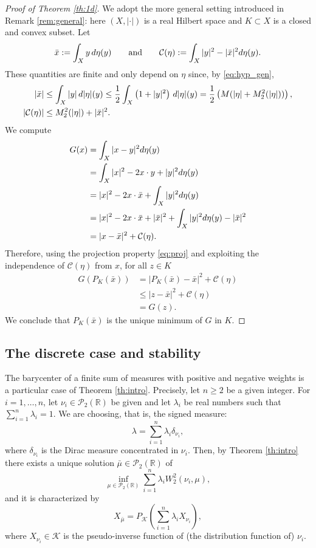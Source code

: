 \documentclass[12pt,a4paper]{article}
\newcommand{\R}{\mathbb{R}}
\renewcommand{\P}{\mathcal{P}}
\renewcommand{\d}{{\rm d}}
\newcommand{\K}{\mathcal{K}}
\theoremstyle{plain}
\theoremstyle{definition}
\begin{document}
\begin{proof}[Proof of Theorem \ref{th:1d}]
We adopt the more general setting introduced in Remark \ref{rem:general}: here $(X,|\cdot|)$ is a real Hilbert space and $K\subset X$ is a closed and convex subset. Let 
\[
	\bar x := \int_{X} y\,\d\eta(y)\qquad \text{and}\qquad \mathcal{C}(\eta):= \int_{X}|y|^2-|\bar x|^2 \d\eta(y).
\] 
These quantities are finite and only depend on $\eta$ since, by \eqref{eq:hyp_gen},
\begin{align*}
	|\bar x| &\leq \int_{X} |y|\,\d|\eta|(y) \leq \frac12\int_{X} \left(1+|y|^2\right)\,\d|\eta|(y) = \frac12\left(M(|\eta|+M_2^2(|\eta|))\right),\\
	|\mathcal{C}(\eta)| & \leq M_2^2(|\eta|) +|\bar x|^2.
\end{align*}
We compute 
\begin{align*}
	G(x)&= \int_X |x-y|^2\d\eta(y) \\
		&= \int_X |x|^2 -2x\cdot y +|y|^2\d\eta(y) \\
		&=  |x|^2 -2x\cdot \bar x +\int_X |y|^2\d\eta(y) \\
		&=  |x|^2 -2x\cdot \bar x +|\bar x|^2 +\int_X |y|^2\d\eta(y) -|\bar x|^2\\		
		&=  |x-\bar x|^2 +\mathcal{C}(\eta).
\end{align*}
Therefore, using the projection property \eqref{eq:proj} and exploiting the independence of $\mathcal{C}(\eta)$ from $x$, for all $z\in K$ 
\begin{align*}
	G\left( P_{K}(\bar x)\right)   & = |P_{K}(\bar x)-\bar x|^2 + \mathcal{C}(\eta)\\
		& \leq |z-\bar x|^2 + \mathcal{C}(\eta) \\
		&=G(z).
\end{align*}	
We conclude that $P_{K}(\bar x)$ is the unique minimum of $G$ in $K$.

\end{proof}


\subsection{The discrete case and stability}
\label{ssec:stable}
The barycenter of a finite sum of measures with positive and negative weights is a particular case of Theorem \ref{th:intro}. Precisely, let $n\geq 2$ be a given integer. For $i=1,\dots,n$, let $\nu_i\in \P_2(\R)$ be given and let $\lambda_i$  be real numbers such that $\sum_{i=1}^n\lambda_i =1$. We are choosing, that is, the signed measure:
\[
	\lambda = \sum_{i=1}^n\lambda_i \delta_{\nu_i},
\]
where $\delta_{\nu_i}$ is the Dirac measure concentrated in $\nu_i$. Then, by Theorem \ref{th:intro} there exists a unique solution $\bar \mu \in \P_2(\R)$ of
\[	
	\inf_{\mu \in \P_2(\R)} \sum_{i=1}^n \lambda_i W_2^2(\nu_i,\mu),
\]
and it is characterized by
\begin{equation}
\label{eq:1d_charact}
	X_{\bar \mu} = P_\K\left( \sum_{i=1}^n \lambda_i X_{\nu_i}\right),
\end{equation}
where $X_{\nu_i}\in \K$ is the pseudo-inverse function of (the distribution function of) $\nu_i$.
\end{document}
